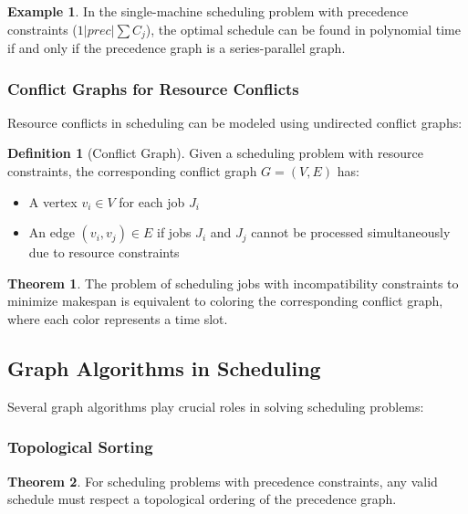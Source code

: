 \documentclass{article}
\theoremstyle{definition}
\newtheorem{example}{Example}
\newtheorem{theorem}{Theorem}
\newtheorem{definition}{Definition}
\begin{document}
\begin{example}
In the single-machine scheduling problem with precedence constraints ($1|prec|\sum C_j$), the optimal schedule can be found in polynomial time if and only if the precedence graph is a series-parallel graph.
\end{example}

\subsubsection*{Conflict Graphs for Resource Conflicts}

Resource conflicts in scheduling can be modeled using undirected conflict graphs:

\begin{definition}[Conflict Graph]
Given a scheduling problem with resource constraints, the corresponding conflict graph $G = (V, E)$ has:
\begin{itemize}
    \item A vertex $v_i \in V$ for each job $J_i$
    \item An edge $(v_i, v_j) \in E$ if jobs $J_i$ and $J_j$ cannot be processed simultaneously due to resource constraints
\end{itemize}
\end{definition}

\begin{theorem}
The problem of scheduling jobs with incompatibility constraints to minimize makespan is equivalent to coloring the corresponding conflict graph, where each color represents a time slot.
\end{theorem}

\subsection*{Graph Algorithms in Scheduling}

Several graph algorithms play crucial roles in solving scheduling problems:

\subsubsection*{Topological Sorting}

\begin{theorem}
For scheduling problems with precedence constraints, any valid schedule must respect a topological ordering of the precedence graph.
\end{theorem}
\end{document}

